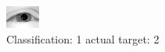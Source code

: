 \begin{figure}[h!]
\begin{center}
\includegraphics[width=0.60\columnwidth]{figures/ID2253_class_1_target_2.png}
\end{center}
\caption{ Classification: 1 actual target: 2}
\label{fig:ID2253_class_1_target_2}
\end{figure}
